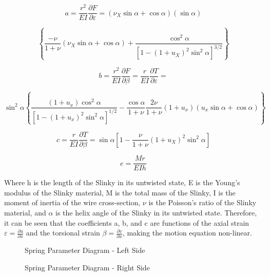 \documentclass{mcmthesis}  %
\begin{document}
\begin{appendices}
\begin{equation}
a = \frac{r^2}{EI}\frac{\partial F}{\partial \varepsilon} = (\nu_X \sin \alpha + \cos \alpha)(\sin \alpha)
\end{equation}

\begin{equation}
\left\{
\frac{-\nu}{1+\nu}(\nu_X \sin \alpha + \cos \alpha) + \frac{\cos^2 \alpha}{\left[1-(1+u_X)^2\sin^2 \alpha\right]^{3/2}} 
\right\}
\end{equation}

\begin{equation}
b = \frac{r^2}{EI}\frac{\partial F}{\partial \beta} = \frac{r}{EI}\frac{\partial T}{\partial \varepsilon} =
\end{equation}

\begin{equation}
\sin^2 \alpha \left\{
\frac{(1+u_x)\cos^2 \alpha}{\left[1-(1+u_x)^2\sin^2\alpha\right]^{1/2}} - \frac{\cos\alpha}{1+\nu} \frac{2\nu}{1+\nu}(1+u_x)(u_x\sin\alpha+\cos\alpha)
\right\}
\end{equation}

\begin{equation}
c = \frac{r}{EI}\frac{\partial T}{\partial \beta} = \sin\alpha \left[1-\frac{\nu}{1+\nu}(1+u_X)^2\sin^2\alpha\right]
\end{equation}

\begin{equation}
e = \frac{Mr}{EIh}
\end{equation}

Where h is the length of the Slinky in its untwisted state, E is the Young's modulus of the Slinky material, M is the total mass of the Slinky, I is the moment of inertia of the wire cross-section, $\nu$ is the Poisson's ratio of the Slinky material, and $\alpha$ is the helix angle of the Slinky in its untwisted state. Therefore, it can be seen that the coefficients a, b, and c are functions of the axial strain $\varepsilon = \frac{\partial u}{\partial x}$ and the torsional strain $\beta = \frac{\partial v}{\partial x}$, making the motion equation non-linear.

\begin{figure}[h!]
    \centering
    \caption{Spring Parameter Diagram - Left Side}
    \label{fig:spring_params_left}
\end{figure}

\begin{figure}[h!]
    \centering
    \caption{Spring Parameter Diagram - Right Side}
    \label{fig:spring_params_right}
\end{figure}


\end{appendices}
\end{document}
